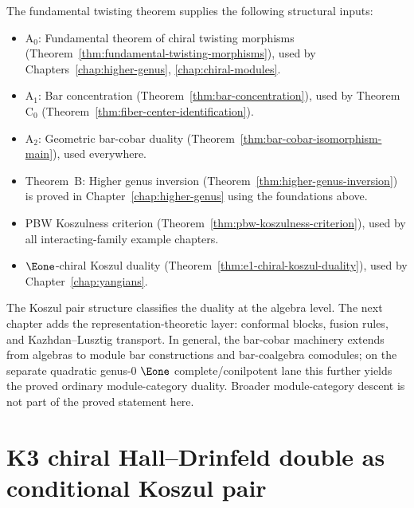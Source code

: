 \begin{remark}\label{rem:ckp-dependency-digest}
The fundamental twisting theorem supplies the following structural
inputs:
\begin{itemize}
\item $\mathrm{A}_0$: Fundamental theorem of chiral twisting morphisms
 (Theorem~\ref{thm:fundamental-twisting-morphisms}), used by
 Chapters~\ref{chap:higher-genus}, \ref{chap:chiral-modules}.
\item $\mathrm{A}_1$: Bar concentration
 (Theorem~\ref{thm:bar-concentration}), used by
 Theorem~$\mathrm{C}_0$
 (Theorem~\ref{thm:fiber-center-identification}).
\item $\mathrm{A}_2$: Geometric bar-cobar duality
 (Theorem~\ref{thm:bar-cobar-isomorphism-main}), used
 everywhere.
\item Theorem~B: Higher genus inversion
 (Theorem~\ref{thm:higher-genus-inversion}) is
 proved in Chapter~\ref{chap:higher-genus} using the foundations
 above.
\item PBW Koszulness criterion
 (Theorem~\ref{thm:pbw-koszulness-criterion}), used by all
 interacting-family example chapters.
\item $\Eone$-chiral Koszul duality
 (Theorem~\ref{thm:e1-chiral-koszul-duality}), used by
 Chapter~\ref{chap:yangians}.
\end{itemize}
\end{remark}

The Koszul pair structure classifies the duality at the algebra level.
The next chapter adds the representation-theoretic layer: conformal
blocks, fusion rules, and Kazhdan--Lusztig transport. In general, the
bar-cobar machinery extends from algebras to module bar constructions
and bar-coalgebra comodules; on the separate quadratic genus-$0$
$\Eone$ complete/conilpotent lane this further yields the proved
ordinary module-category duality. Broader module-category descent is
not part of the proved statement here.

\section{K3 chiral Hall--Drinfeld double as conditional Koszul pair}
\label{sec:ckp-supplement}

